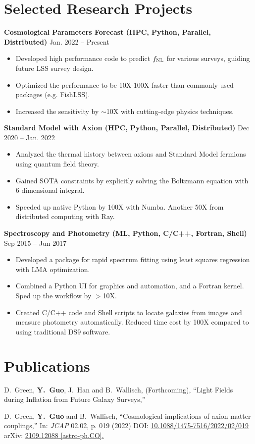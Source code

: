 \documentclass[letterpaper,12pt]{article}
\newenvironment{zitemize}{
\begin{itemize} \vspace{-.8em}\itemsep 0pt \parskip 0pt}
{\end{itemize}\vspace{-.7em}}
\newcommand{\proglang}[1]{#1}
\begin{document}
\section{Selected Research Projects}
\textbf{Cosmological Parameters Forecast (HPC, Python, Parallel, Distributed)} \hfill Jan. 2022 -- Present \\
\begin{zitemize}
    \item Developed high performance code to predict $f_{\rm NL}$ for various surveys, guiding future LSS survey design.
    \item Optimized the performance to be 10X-100X faster than commonly used packages (e.g. FishLSS).
    \item Increased the sensitivity by $\sim$10X with cutting-edge physics techniques.
\end{zitemize}

\textbf{Standard Model with Axion (HPC, Python, Parallel, Distributed)} \hfill Dec 2020 -- Jan. 2022 \\
\begin{zitemize}
    \item Analyzed the thermal history between axions and Standard Model fermions using quantum field theory. 
    \item Gained SOTA constraints by explicitly solving the Boltzmann equation with 6-dimensional integral.
    \item Speeded up native \proglang{Python} by 100X with \proglang{Numba}. Another 50X from distributed computing with \proglang{Ray}.
\end{zitemize}

\textbf{Spectroscopy and Photometry (ML, Python, C/C++, Fortran, Shell)} \hfill Sep 2015 -- Jun 2017 \\
\begin{zitemize}
    \item Developed a package for rapid spectrum fitting using least squares regression with LMA optimization.
    \item Combined a \proglang{Python} UI for graphics and automation, and a \proglang{Fortran} kernel. Sped up the workflow by $>$10X. 
    \item Created \proglang{C/C++} code and \proglang{Shell} scripts to locate galaxies from images and measure photometry automatically. Reduced time cost by 100X compared to using traditional DS9 software.
\end{zitemize}


\section{Publications}

D.~Green, \textbf{Y.~Guo}, J.~Han and B.~Wallisch, (Forthcoming),
``Light Fields during Inflation from Future Galaxy Surveys,''

D.~Green, \textbf{Y.~Guo} and B.~Wallisch,
``Cosmological implications of axion-matter couplings,''
In: \textit{JCAP} 02.02, p. 019 (2022)
DOI: \href{https://iopscience.iop.org/article/10.1088/1475-7516/2022/02/019}{10.1088/1475-7516/2022/02/019}
arXiv: \href{https://arxiv.org/abs/2109.12088?context=hep-ph}{2109.12088 [astro-ph.CO].}
\end{document}
